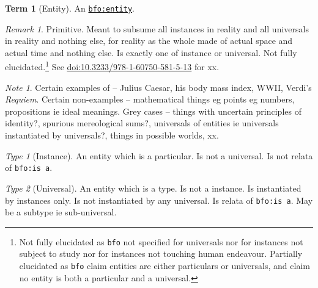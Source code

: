 \documentclass{amsart}%
\newcommand{\code}[1]{\texttt{#1}}%
\newcommand{\titleit}[1]{\textit{#1}}%
\theoremstyle{plain}
\theoremstyle{definition}
\theoremstyle{remark}
\newtheorem*{note}{Note}
\theoremstyle{definition}
\newtheorem{term}{Term}[subsection]%
\theoremstyle{remark}
\newtheorem*{term-type}{Type}
\newtheorem*{term-note}{Remark}
\begin{document}
\begin{term}[Entity]
\label{term:entity}
An \href{http://purl.obolibrary.org/obo/BFO_0000001}{\code{bfo:entity}}.
\begin{term-note}
Primitive. Meant to subsume all instances in reality %
and all universals in reality and nothing else, for reality as the whole made of actual space and actual time and nothing else. Is exactly one of instance or universal. Not fully elucidated.\footnote{Not fully elucidated as \code{bfo} not specified for universals nor for instances not subject to study nor for instances not touching human endeavour. %
%
%
Partially elucidated as \code{bfo} claim entities are either particulars or universals, and claim no entity is both a particular and a universal.} See \href{https://doi.org/10.3233/978-1-60750-581-5-13}{doi:10.3233/978-1-60750-581-5-13} for xx.
\end{term-note}
\begin{note}
Certain examples of -- Julius Caesar, his body mass index, WWII, Verdi's \titleit{Requiem}. Certain non-examples -- mathematical things eg points eg numbers, propositions ie ideal meanings. Grey cases -- things with uncertain principles of identity?, spurious mereological sums?, universals of entities ie universals instantiated by universals?, things in possible worlds, xx.%
\end{note}
\begin{term-type}[Instance]
An entity which is a particular. Is not a universal. Is not relata of \code{bfo:is a}.
\end{term-type}
\begin{term-type}[Universal]
An entity which is a type. Is not a instance. Is instantiated by instances only. Is not instantiated by any universal. Is relata of \code{bfo:is a}. May be a subtype ie sub-universal.%
\end{term-type}
\end{term}
%
%
%
%
%
\end{document}
